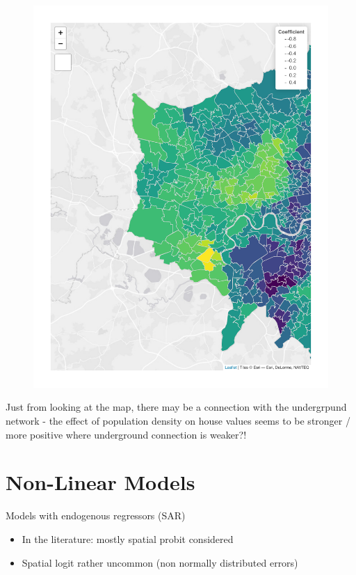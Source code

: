 \documentclass[
  letterpaper,
]{scrbook}
\begin{document}
\begin{figure}[H]

{\centering \includegraphics{10_other_files/figure-pdf/unnamed-chunk-5-1.pdf}

}

\end{figure}

Just from looking at the map, there may be a connection with the
undergrpund network - the effect of population density on house values
seems to be stronger / more positive where underground connection is
weaker?!

\hypertarget{non-linear-models}{%
\section{Non-Linear Models}\label{non-linear-models}}

Models with endogenous regressors (SAR)

\begin{itemize}
\item
  In the literature: mostly spatial probit considered
\item
  Spatial logit rather uncommon (non normally distributed errors)
\end{itemize}
\end{document}
